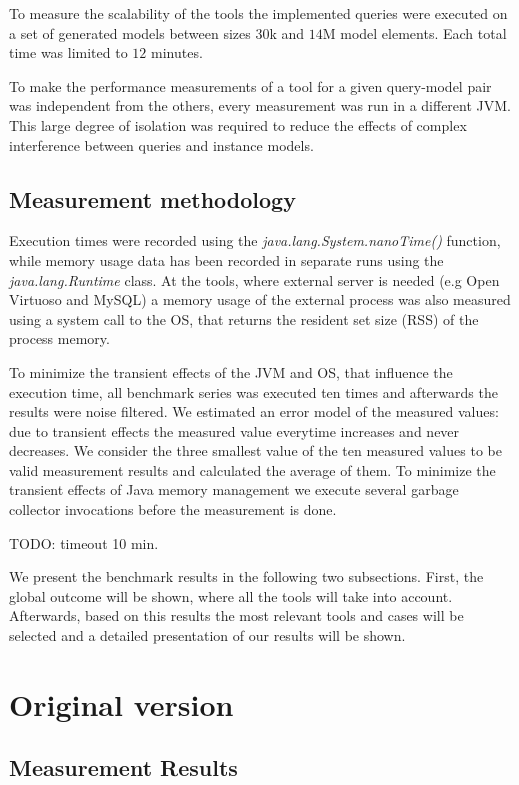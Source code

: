 To measure the scalability of the tools the implemented queries were executed on
a set of generated models between sizes $30$k and $14$M model elements. Each
total time was limited to $12$ minutes.

To make the performance measurements of a tool for a given query-model pair was
independent from the others, every measurement was run in a different JVM. This
large degree of isolation was required to reduce the effects of complex interference
between queries and instance models.


\subsection{Measurement methodology}
Execution times were recorded using the \emph{java.lang.System.nanoTime()}
function, while memory usage data has been recorded in separate runs using the
\emph{java.lang.Runtime} class. At the tools, where external server is needed
(e.g Open Virtuoso and MySQL) a memory usage of the external process was also
measured using a system call to the OS, that returns the resident set size (RSS)
of the process memory.

To minimize the transient effects of the JVM and OS, that influence the
execution time, all benchmark series was executed ten times and afterwards the
results were noise filtered. We estimated an error model of the measured values:
due to transient effects the measured value everytime increases and never
decreases. We consider the three smallest value of the ten measured values to be
valid measurement results and calculated the average of them. To minimize the
transient effects of Java memory management we execute several garbage collector
invocations before the measurement is done.

TODO: timeout 10 min.


We present the benchmark results in the following two subsections. First, the
global outcome will be shown, where all the tools will take into account.
Afterwards, based on this results the most relevant tools and cases will be
selected and a detailed presentation of our results will be shown.


\section{Original version}
\subsection{Measurement Results}\label{sec:results}

